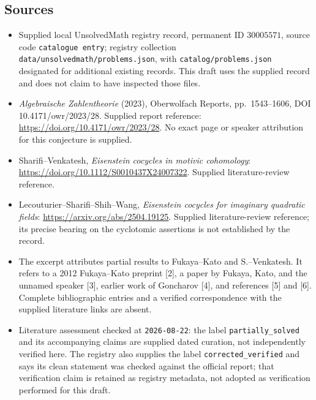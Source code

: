 \documentclass[11pt]{article}
\begin{document}
\subsection{Sources}
\begin{itemize}
\item Supplied local UnsolvedMath registry record, permanent ID \(30005571\), source code \texttt{catalogue entry}; registry collection \texttt{data/unsolvedmath/problems.json}, with \texttt{catalog/problems.json} designated for additional existing records. This draft uses the supplied record and does not claim to have inspected those files.
\item \emph{Algebraische Zahlentheorie} (2023), Oberwolfach Reports, pp.\ 1543--1606, DOI 10.4171/owr/2023/28. Supplied report reference: \url{https://doi.org/10.4171/owr/2023/28}. No exact page or speaker attribution for this conjecture is supplied.
\item Sharifi--Venkatesh, \emph{Eisenstein cocycles in motivic cohomology}: \url{https://doi.org/10.1112/S0010437X24007322}. Supplied literature-review reference.
\item Lecouturier--Sharifi--Shih--Wang, \emph{Eisenstein cocycles for imaginary quadratic fields}: \url{https://arxiv.org/abs/2504.19125}. Supplied literature-review reference; its precise bearing on the cyclotomic assertions is not established by the record.
\item The excerpt attributes partial results to Fukaya--Kato and S.--Venkatesh. It refers to a 2012 Fukaya--Kato preprint [2], a paper by Fukaya, Kato, and the unnamed speaker [3], earlier work of Goncharov [4], and references [5] and [6]. Complete bibliographic entries and a verified correspondence with the supplied literature links are absent.
\item Literature assessment checked at \texttt{2026-08-22}: the label \texttt{partially\_solved} and its accompanying claims are supplied dated curation, not independently verified here. The registry also supplies the label \texttt{corrected\_verified} and says its clean statement was checked against the official report; that verification claim is retained as registry metadata, not adopted as verification performed for this draft.
\end{itemize}
\end{document}
